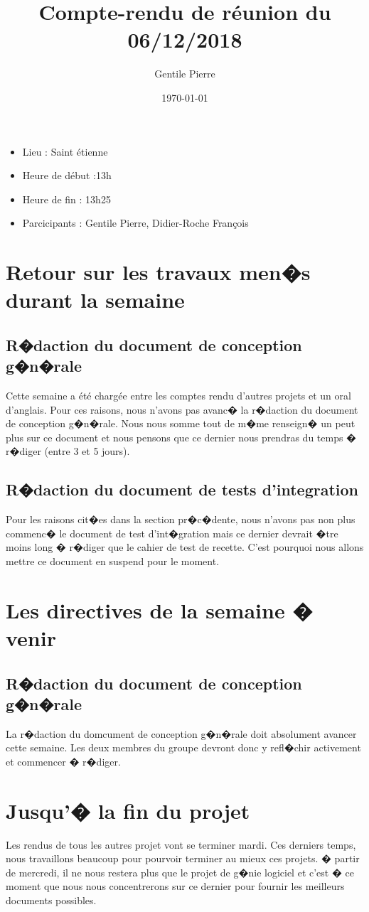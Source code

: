\documentclass[a4paper]{article}
\title{Compte-rendu de réunion du 06/12/2018}
\author{Gentile Pierre}
\date{\today}
\begin{document}
\renewcommand{\contentsname}{Ordre du jour}
\maketitle
\thispagestyle{fancy}


\begin{itemize}
\item Lieu : Saint étienne
\item Heure de début :13h
\item Heure de fin : 13h25
\item Parcicipants : Gentile Pierre, Didier-Roche François
\end{itemize}

\bigbreak
\bigbreak
\bigbreak

\tableofcontents


\newpage

\section{Retour sur les travaux men�s durant la semaine}
\subsection{R�daction du document de conception g�n�rale}
Cette semaine a été chargée entre les comptes rendu d'autres projets et un oral d'anglais. Pour ces raisons, nous n'avons pas avanc� la r�daction du document de conception g�n�rale. Nous nous somme tout de m�me renseign� un peut plus sur ce document et nous pensons que ce dernier nous prendras du temps � r�diger (entre 3 et 5 jours).
\subsection{R�daction du document de tests d'integration}
Pour les raisons cit�es dans la section pr�c�dente, nous n'avons pas non plus commenc� le document de test d'int�gration mais ce dernier devrait �tre moins long � r�diger que le cahier de test de recette.
C'est pourquoi nous allons mettre ce document en suspend pour le moment.

\section{Les directives de la semaine � venir}
\subsection{R�daction du document de conception g�n�rale}
La r�daction du domcument de conception g�n�rale doit absolument avancer cette semaine. Les deux membres du groupe devront donc y refl�chir activement et commencer � r�diger.

\section{Jusqu'� la fin du projet}
Les rendus de tous les autres projet vont se terminer mardi. Ces derniers temps, nous travaillons beaucoup pour pourvoir terminer au mieux ces projets. � partir de mercredi, il ne nous restera plus que le projet de g�nie logiciel et c'est � ce moment que nous nous concentrerons sur ce dernier pour fournir les meilleurs documents possibles.
\end{document}
